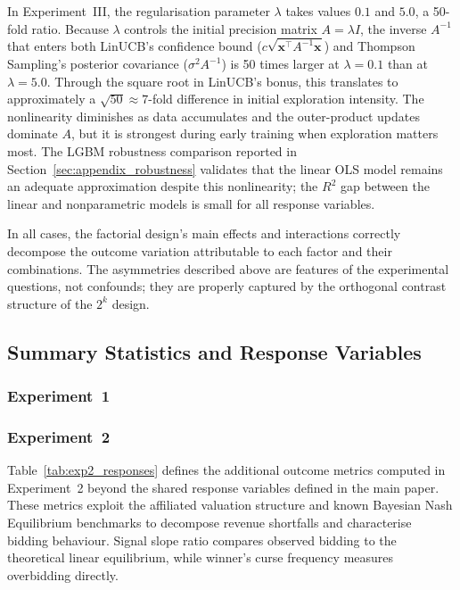 In Experiment~III, the regularisation parameter $\lambda$ takes values $0.1$ and $5.0$, a 50-fold ratio. Because $\lambda$ controls the initial precision matrix $A = \lambda I$, the inverse $A^{-1}$ that enters both LinUCB's confidence bound ($c\sqrt{\mathbf{x}^\top A^{-1}\mathbf{x}}$) and Thompson Sampling's posterior covariance ($\sigma^2 A^{-1}$) is 50 times larger at $\lambda=0.1$ than at $\lambda=5.0$. Through the square root in LinUCB's bonus, this translates to approximately a $\sqrt{50}\approx 7$-fold difference in initial exploration intensity. The nonlinearity diminishes as data accumulates and the outer-product updates dominate $A$, but it is strongest during early training when exploration matters most. The LGBM robustness comparison reported in Section~\ref{sec:appendix_robustness} validates that the linear OLS model remains an adequate approximation despite this nonlinearity; the $R^2$ gap between the linear and nonparametric models is small for all response variables.

In all cases, the factorial design's main effects and interactions correctly decompose the outcome variation attributable to each factor and their combinations. The asymmetries described above are features of the experimental questions, not confounds; they are properly captured by the orthogonal contrast structure of the $2^k$ design.

\subsection{Summary Statistics and Response Variables}
\label{sec:appendix_summary}

\subsubsection{Experiment~1}



\subsubsection{Experiment~2}

Table~\ref{tab:exp2_responses} defines the additional outcome metrics computed in Experiment~2 beyond the shared response variables defined in the main paper. These metrics exploit the affiliated valuation structure and known Bayesian Nash Equilibrium benchmarks to decompose revenue shortfalls and characterise bidding behaviour. Signal slope ratio compares observed bidding to the theoretical linear equilibrium, while winner's curse frequency measures overbidding directly.

